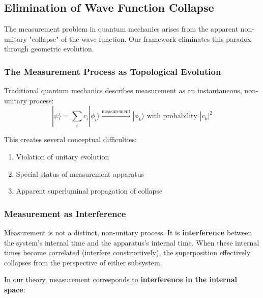 \subsection{Elimination of Wave Function Collapse}

The measurement problem in quantum mechanics arises from the apparent non-unitary "collapse" of the wave function. Our framework eliminates this paradox through geometric evolution.

\subsubsection{The Measurement Process as Topological Evolution}

Traditional quantum mechanics describes measurement as an instantaneous, non-unitary process:
\begin{equation}
    |\psi\rangle = \sum_i c_i |\phi_i\rangle \xrightarrow{\text{measurement}} |\phi_k\rangle \text{ with probability } |c_k|^2
\end{equation}

This creates several conceptual difficulties:
\begin{enumerate}
    \item Violation of unitary evolution
    \item Special status of measurement apparatus
    \item Apparent superluminal propagation of collapse
\end{enumerate}

\subsubsection{Measurement as Interference}

\begin{insight}[Measurement = Interference]
Measurement is not a distinct, non-unitary process. It is \textbf{interference} between the system's internal time and the apparatus's internal time. When these internal times become correlated (interfere constructively), the superposition effectively collapses from the perspective of either subsystem.
\end{insight}

In our theory, measurement corresponds to \textbf{interference in the internal space}:

